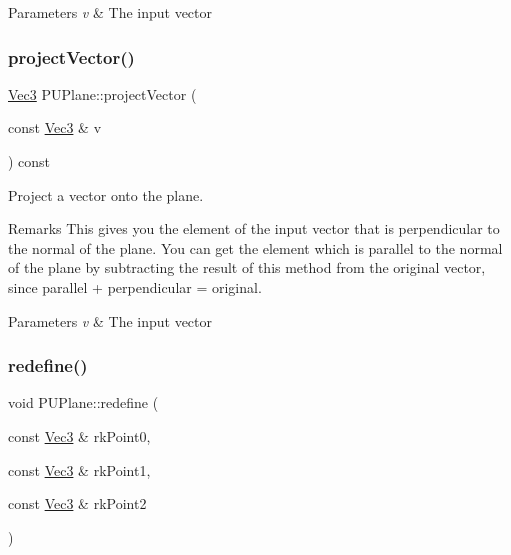 \begin{DoxyParams}{Parameters}
{\em v} & The input vector \\
\hline
\end{DoxyParams}
\mbox{\label{classPUPlane_a7e389950f054b35612eeb8d03651fffe}} 
\subsubsection{\texorpdfstring{project\+Vector()}{projectVector()}\hspace{0.1cm}{\footnotesize\ttfamily [2/2]}}
{\footnotesize\ttfamily \hyperlink{classVec3}{Vec3} P\+U\+Plane\+::project\+Vector (\begin{DoxyParamCaption}\item[{const \hyperlink{classVec3}{Vec3} \&}]{v }\end{DoxyParamCaption}) const}

Project a vector onto the plane. \begin{DoxyRemark}{Remarks}
This gives you the element of the input vector that is perpendicular to the normal of the plane. You can get the element which is parallel to the normal of the plane by subtracting the result of this method from the original vector, since parallel + perpendicular = original. 
\end{DoxyRemark}

\begin{DoxyParams}{Parameters}
{\em v} & The input vector \\
\hline
\end{DoxyParams}
\mbox{\label{classPUPlane_ab5f749af7164a88b60533ab92f93456f}} 
\subsubsection{\texorpdfstring{redefine()}{redefine()}\hspace{0.1cm}{\footnotesize\ttfamily [1/4]}}
{\footnotesize\ttfamily void P\+U\+Plane\+::redefine (\begin{DoxyParamCaption}\item[{const \hyperlink{classVec3}{Vec3} \&}]{rk\+Point0,  }\item[{const \hyperlink{classVec3}{Vec3} \&}]{rk\+Point1,  }\item[{const \hyperlink{classVec3}{Vec3} \&}]{rk\+Point2 }\end{DoxyParamCaption})}

